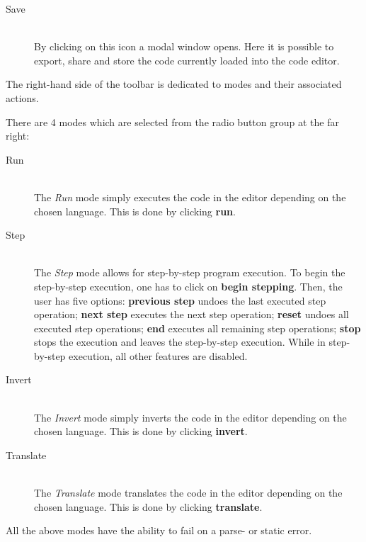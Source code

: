 \begin{description}
  \item[ Save]~\\
    By clicking on this icon a modal window opens. Here it is possible to export, share and store the code currently loaded into the code editor.

\end{description}
The right-hand side of the toolbar is dedicated to modes and their associated actions.

There are 4 modes which are selected from the radio button group at the far right:
\begin{description}

  \item[Run]~\\
    The \textit{Run} mode simply executes the code in the editor depending on the chosen language. This is done by clicking  \textbf{run}.

  \item[Step]~\\
    The \textit{Step} mode allows for step-by-step program execution. %
    To begin the step-by-step execution, one has to click on  \textbf{begin stepping}. Then, the user has five options:
     \textbf{previous step} undoes the last executed step operation;
     \textbf{next step} executes the next step operation;
     \textbf{reset} undoes all executed step operations;
     \textbf{end} executes all remaining step operations;
     \textbf{stop} stops the execution and leaves the step-by-step execution.
    While in step-by-step execution, all other features are disabled.

  \item[Invert]~\\
    The \textit{Invert} mode simply inverts the code in the editor depending on the chosen language. This is done by clicking  \textbf{invert}.

  \item[Translate]~\\
    The \textit{Translate} mode translates the code in the editor depending on the chosen language. This is done by clicking  \textbf{translate}.

\end{description}
All the above modes have the ability to fail on a parse- or static error. %

